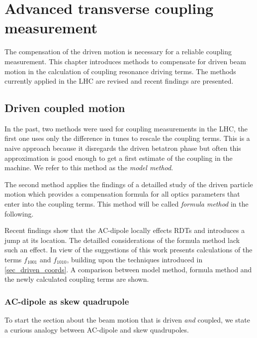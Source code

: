 \chapter{Advanced transverse coupling measurement} 
 \label{sec_coupling}

\begin{chapterinfo}
    The compensation of the driven motion is necessary for a reliable coupling measurement.
    This chapter introduces methods to compensate for driven beam motion in the calculation of
    coupling resonance driving terms. The methods currently applied in the LHC are revised and
    recent findings are presented.
\end{chapterinfo}

\section{Driven coupled motion}
In the past, two methods were used for coupling measurements in
the LHC, the first one uses only the difference in tunes to rescale the coupling terms. This is
a naive approach because it disregards the driven betatron phase but often this approximation is
good enough to get a first estimate of the coupling in the machine. We refer to this method as the
\emph{model method}.

The second method \cite{Miyamoto2010} applies the findings of a detailled study of the driven particle motion
which provides a compensation formula for all optics parameters that enter into the coupling terms. This method will
be called \emph{formula method} in the following.

Recent findings \cite{Carlier2020} show that the AC-dipole locally effects RDTs and introduces
a jump at its location. The detailled considerations of the formula method lack such an effect.
In view of the suggestions of \cite{Carlier2020} this work presents calculations of the terms
$f_{1001}$ and $f_{1010}$, building upon the techniques introduced in \ref{sec_driven_coords}.
A comparison between model method, formula method and the newly calculated coupling terms are shown.


\subsection{AC-dipole as skew quadrupole}

To start the section about the beam motion that is driven \emph{and} coupled, we state a curious
analogy between AC-dipole and skew quadrupoles.

